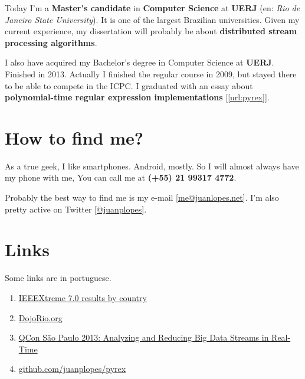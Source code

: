\documentclass[a4paper,12pt,oneside]{article}
\begin{document}
	Today I'm a \textbf{Master's candidate} in \textbf{Computer Science} at
	\textbf{UERJ} (en: \emph{Rio de Janeiro State University}). It is one of the
	largest Brazilian universities. Given my current experience, my dissertation
	will probably be about \textbf{distributed stream processing algorithms}.

	I also have acquired my Bachelor's degree in Computer Science at \textbf{UERJ}.
	Finished in 2013. Actually I finished the regular course in 2009, but stayed
	there to be able to compete in the ICPC. I graduated with an essay about
	\textbf{polynomial-time regular expression implementations} [\ref{url:pyrex}].

\section*{How to find me?}

	As a true geek, I like smartphones. Android, mostly. So I will almost always
	have my phone with me, You can call me at \textbf{(+55) 21 99317 4772}.

	Probably the best way to find me is my e-mail
	[\href{mailto:me@juanlopes.net}{me@juanlopes.net}]. I'm also pretty active on
	Twitter [\href{http://twitter.com/juanplopes}{@juanplopes}].

\section*{Links}

	Some links are in portuguese.

\begin{enumerate}

  \item \label{url:ieeextreme} \href{http://www.ieee.org/membership_services/membership/students/competitions/xtreme/xtreme7_final_rankings-country.pdf}{IEEEXtreme 7.0 results by country}
  \item \label{url:dojorio} \href{http://dojorio.org/}{DojoRio.org}
  \item \label{url:qconsp2013} \href{http://www.infoq.com/br/presentations/analisando-fluxo-dados-tempo-real}{QCon São Paulo 2013: Analyzing and Reducing Big Data Streams in Real-Time}
  \item \label{url:pyrex} \href{http://github.com/juanplopes/pyrex}{github.com/juanplopes/pyrex}
\end{enumerate}
\end{document}
